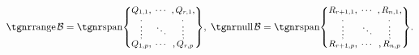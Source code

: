 $\range\mB=\Spn{\small\begin{Bmatrix} \underset{\;,}{Q_{1,1}}, &\hspace{-6pt} \cdots &\hspace{-6pt} ,\underset{\!\!,}{Q_{r,1}},\\[-2pt] \vdots &\hspace{-6pt} \ddots &\hspace{-6pt} \vdots\\[-2pt] \overset{\;,}{Q_{1,p}}, &\hspace{-6pt} \cdots &\hspace{-6pt} ,\overset{\!\!\!,}{Q_{r,p}}\end{Bmatrix}},\;\null\mB=\Spn{\small\begin{Bmatrix} \underset{\;,}{R_{r+1,1}}, &\hspace{-6pt} \cdots &\hspace{-6pt} ,\underset{\!\!,}{R_{n,1}},\\[-2pt] \vdots &\hspace{-6pt} \ddots &\hspace{-6pt} \vdots\\[-2pt] \overset{\;,}{R_{r+1,p}}, &\hspace{-6pt} \cdots &\hspace{-6pt} ,\overset{\!\!\!,}{R_{n,p}}\end{Bmatrix}}.$\PfEnd[-14pt]
\SepLine\pagebreak


